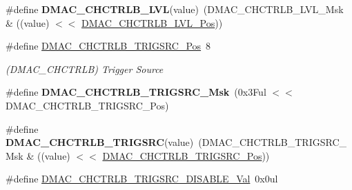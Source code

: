 \begin{DoxyCompactItemize}
\item 
\hypertarget{group___s_a_m_l21___d_m_a_c_ga22283c85cfcd7e68bf8f0f8ffef67dcc}{}\#define {\bfseries D\+M\+A\+C\+\_\+\+C\+H\+C\+T\+R\+L\+B\+\_\+\+L\+V\+L}(value)~(D\+M\+A\+C\+\_\+\+C\+H\+C\+T\+R\+L\+B\+\_\+\+L\+V\+L\+\_\+\+Msk \& ((value) $<$$<$ \hyperlink{group___s_a_m_l21___d_m_a_c_ga4074cd8284b192e5d6fabcd787ced731}{D\+M\+A\+C\+\_\+\+C\+H\+C\+T\+R\+L\+B\+\_\+\+L\+V\+L\+\_\+\+Pos}))\label{group___s_a_m_l21___d_m_a_c_ga22283c85cfcd7e68bf8f0f8ffef67dcc}

\item 
\hypertarget{group___s_a_m_l21___d_m_a_c_ga4716e5db96b3eb256a9f899457c3375c}{}\#define \hyperlink{group___s_a_m_l21___d_m_a_c_ga4716e5db96b3eb256a9f899457c3375c}{D\+M\+A\+C\+\_\+\+C\+H\+C\+T\+R\+L\+B\+\_\+\+T\+R\+I\+G\+S\+R\+C\+\_\+\+Pos}~8\label{group___s_a_m_l21___d_m_a_c_ga4716e5db96b3eb256a9f899457c3375c}

\begin{DoxyCompactList}\small\item\em (D\+M\+A\+C\+\_\+\+C\+H\+C\+T\+R\+L\+B) Trigger Source \end{DoxyCompactList}\item 
\hypertarget{group___s_a_m_l21___d_m_a_c_ga56d1c80c8387f39526a3330c62805c31}{}\#define {\bfseries D\+M\+A\+C\+\_\+\+C\+H\+C\+T\+R\+L\+B\+\_\+\+T\+R\+I\+G\+S\+R\+C\+\_\+\+Msk}~(0x3\+Ful $<$$<$ D\+M\+A\+C\+\_\+\+C\+H\+C\+T\+R\+L\+B\+\_\+\+T\+R\+I\+G\+S\+R\+C\+\_\+\+Pos)\label{group___s_a_m_l21___d_m_a_c_ga56d1c80c8387f39526a3330c62805c31}

\item 
\hypertarget{group___s_a_m_l21___d_m_a_c_gaa9c7962cdd8fc398c76183b2e777ee96}{}\#define {\bfseries D\+M\+A\+C\+\_\+\+C\+H\+C\+T\+R\+L\+B\+\_\+\+T\+R\+I\+G\+S\+R\+C}(value)~(D\+M\+A\+C\+\_\+\+C\+H\+C\+T\+R\+L\+B\+\_\+\+T\+R\+I\+G\+S\+R\+C\+\_\+\+Msk \& ((value) $<$$<$ \hyperlink{group___s_a_m_l21___d_m_a_c_ga4716e5db96b3eb256a9f899457c3375c}{D\+M\+A\+C\+\_\+\+C\+H\+C\+T\+R\+L\+B\+\_\+\+T\+R\+I\+G\+S\+R\+C\+\_\+\+Pos}))\label{group___s_a_m_l21___d_m_a_c_gaa9c7962cdd8fc398c76183b2e777ee96}

\item 
\hypertarget{group___s_a_m_l21___d_m_a_c_ga855c3e6786f7b074a870d31d85888a87}{}\#define \hyperlink{group___s_a_m_l21___d_m_a_c_ga855c3e6786f7b074a870d31d85888a87}{D\+M\+A\+C\+\_\+\+C\+H\+C\+T\+R\+L\+B\+\_\+\+T\+R\+I\+G\+S\+R\+C\+\_\+\+D\+I\+S\+A\+B\+L\+E\+\_\+\+Val}~0x0ul\label{group___s_a_m_l21___d_m_a_c_ga855c3e6786f7b074a870d31d85888a87}


\end{DoxyCompactItemize}
